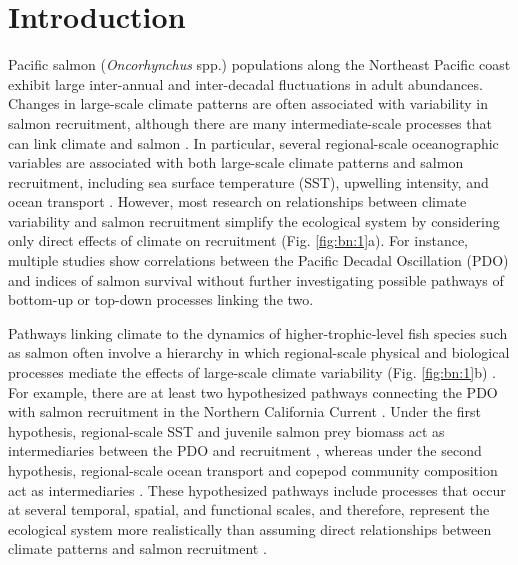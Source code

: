 \section{Introduction}

Pacific salmon (\emph{Oncorhynchus} spp.) populations along the Northeast
Pacific coast exhibit large inter-annual and inter-decadal fluctuations in adult
abundances. Changes in large-scale climate patterns are often associated with
variability in salmon recruitment, although there are many intermediate-scale
processes that can link climate and salmon \citep{Mueter2002a, Beamish2004b,
Drinkwater2010a, Malick2015a}. In particular, several regional-scale
oceanographic variables are associated with both large-scale climate patterns
and salmon recruitment, including sea surface temperature (SST), upwelling
intensity, and ocean transport \citep{King2011, Chavez2003a, Keister2011a}.
However, most research on relationships between climate variability and salmon
recruitment simplify the ecological system by considering only direct effects of
climate on recruitment (Fig. \ref{fig:bn:1}a). For instance, multiple studies
show correlations between the Pacific Decadal Oscillation (PDO) and indices of
salmon survival \citep{Mantua1997a, Burke2013, Malick2009a} without further
investigating possible pathways of bottom-up or top-down processes linking the
two.

Pathways linking climate to the dynamics of higher-trophic-level fish species
such as salmon often involve a hierarchy in which regional-scale physical and
biological processes mediate the effects of large-scale climate variability
(Fig. \ref{fig:bn:1}b) \citep{Drinkwater2010a, Ottersen2010a, Dippner2006}. For
example, there are at least two hypothesized pathways connecting the PDO with
salmon recruitment in the Northern California Current \citep{Wells2008a,
Keister2011a}. Under the first hypothesis, regional-scale SST and juvenile
salmon prey biomass act as intermediaries between the PDO and recruitment
\citep{Daly2013, Cole2000a}, whereas under the second hypothesis, regional-scale
ocean transport and copepod community composition act as intermediaries
\citep{Bi2011a, Keister2011a}. These hypothesized pathways include processes
that occur at several temporal, spatial, and functional scales, and therefore,
represent the ecological system more realistically than assuming direct
relationships between climate patterns and salmon recruitment \citep{Levin1992a,
Ottersen2010a, Bakun1996a, Hunt2002a}.

